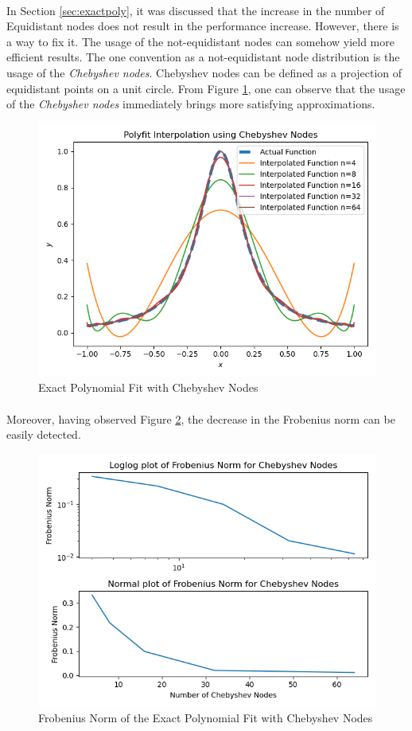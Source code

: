 \documentclass[letterpaper,12pt]{article}
\begin{document}
\paragraph{} In Section \ref{sec:exactpoly}, it was discussed that the increase in the number of Equidistant nodes does not result in the performance increase. However, there is a way to fix it. The usage of the not-equidistant nodes can somehow yield more efficient results. The one convention as a not-equidistant node distribution is the usage of the \textit{Chebyshev nodes}. Chebyshev nodes can be defined as a projection of equidistant points on a unit circle. From Figure \ref{fig:polycheby}, one can observe that the usage of the \textit{Chebyshev nodes} immediately brings more satisfying approximations.
\begin{figure}[H]
    \centerline{\includegraphics[width=0.8\linewidth]{figures/polycheby.png}}
    \caption{Exact Polynomial Fit with Chebyshev Nodes}
    \label{fig:polycheby}
    \end{figure}
\paragraph{} Moreover, having observed Figure \ref{fig:frobpolycheby}, the decrease in the Frobenius norm can be easily detected.
\begin{figure}[H]
    \centerline{\includegraphics[width=0.7\linewidth]{figures/frobpolycheby.png}}
    \caption{Frobenius Norm of the Exact Polynomial Fit with Chebyshev Nodes}
    \label{fig:frobpolycheby}
    \end{figure}
\end{document}

